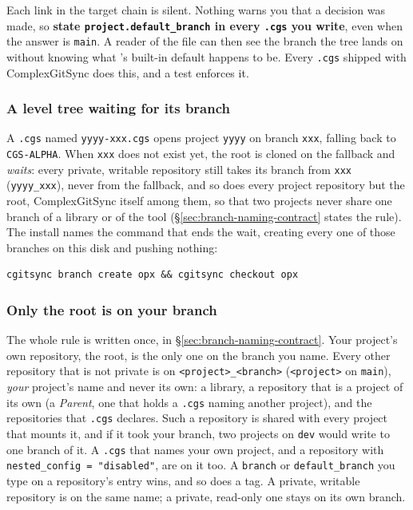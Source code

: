 Each link in the target chain is silent. Nothing warns you that a decision
was made, so \textbf{state \texttt{project.default\_branch} in every
\texttt{.cgs} you write}, even when the answer is \texttt{main}. A reader of
the file can then see the branch the tree lands on without knowing what
\cgscli{}'s built-in default happens to be. Every \texttt{.cgs} shipped with
ComplexGitSync does this, and a test enforces it.

\subsubsection{A level tree waiting for its branch}

A \texttt{.cgs} named \texttt{yyyy-xxx.cgs} opens project \texttt{yyyy} on
branch \texttt{xxx}, falling back to \texttt{CGS-ALPHA}. When \texttt{xxx}
does not exist yet, the root is cloned on the fallback and \emph{waits}: every
private, writable repository still takes its branch from \texttt{xxx}
(\texttt{yyyy\_xxx}), never from the fallback, and so does every project
repository but the root, ComplexGitSync itself among them, so that two projects
never share one branch of a library or of the tool
(\S\ref{sec:branch-naming-contract} states the rule). The install names the
command that ends the wait, creating every one of those branches on this disk
and pushing nothing:

\begin{verbatim}
cgitsync branch create opx && cgitsync checkout opx
\end{verbatim}

\subsubsection{Only the root is on your branch}

The whole rule is written once, in \S\ref{sec:branch-naming-contract}.
Your project's own repository, the root, is the only one on the branch you
name. Every other repository that is not private is on
\texttt{<project>\_<branch>} (\texttt{<project>} on \texttt{main}), \emph{your}
project's name and never its own: a library, a repository that is a project
of its own (a \emph{Parent}, one that holds a \texttt{.cgs} naming another
project), and the repositories that \texttt{.cgs} declares. Such a repository is
shared with every project that mounts it, and if it took your branch, two
projects on \texttt{dev} would write to one branch of it. A \texttt{.cgs} that
names your own project, and a repository with
\texttt{nested\_config = "disabled"}, are on it too. A \texttt{branch} or
\texttt{default\_branch} you type on a repository's entry wins, and so does a
tag. A private, writable repository is on the same name; a private,
read-only one stays on its own branch.

